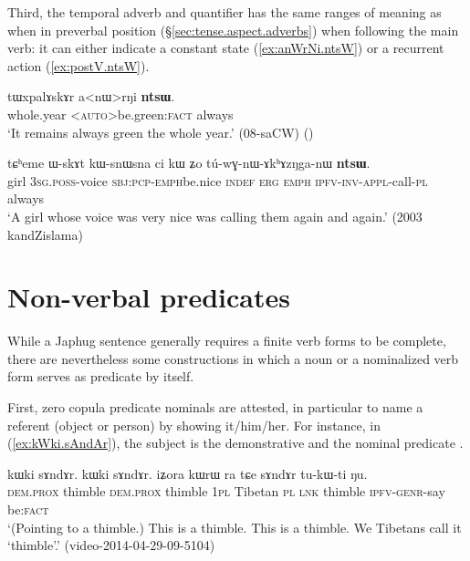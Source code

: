 Third, the temporal adverb and quantifier  has the same ranges of meaning as when in preverbal position (§\ref{sec:tense.aspect.adverbs})  when following the main verb: it can either indicate a constant state (\ref{ex:anWrNi.ntsW}) or a recurrent action (\ref{ex:postV.ntsW}).

\begin{exe}
\ex \label{ex:anWrNi.ntsW}
\gll tɯxpalɤskɤr a<nɯ>rŋi \textbf{ntsɯ}. \\
whole.year <\textsc{auto}>be.green:\textsc{fact} always \\
\glt `It remains always green the whole year.' (08-saCW)
()
\end{exe}

\begin{exe}
\ex \label{ex:postV.ntsW}
\gll  tɕʰeme ɯ-skɤt kɯ-snɯ\redp{}sna ci kɯ ʑo tú-wɣ-nɯ-ɤkʰɤzŋga-nɯ \textbf{ntsɯ}. \\
girl \textsc{3sg}.\textsc{poss}-voice \textsc{sbj}:\textsc{pcp}-\textsc{emph}\redp{}be.nice \textsc{indef} \textsc{erg} \textsc{emph} \textsc{ipfv}-\textsc{inv}-\textsc{appl}-call-\textsc{pl} always \\
\glt `A girl whose voice was very nice was calling them again and again.' (2003 kandZislama)
\end{exe}

 
\section{Non-verbal predicates} \label{sec:non.verbal.predicates}
While a Japhug sentence generally requires a finite verb forms to be complete, there are nevertheless some constructions in which a noun or a nominalized verb form serves as predicate by itself.

First, zero copula predicate nominals are attested, in particular to name a referent (object or person) by showing it/him/her. For instance, in (\ref{ex:kWki.sAndAr}), the subject is the demonstrative  and the nominal predicate . 
 
\begin{exe}
\ex \label{ex:kWki.sAndAr}
\gll kɯki sɤndɤr. kɯki sɤndɤr. iʑora kɯrɯ ra tɕe sɤndɤr tu-kɯ-ti ŋu. \\
\textsc{dem}.\textsc{prox} thimble  \textsc{dem}.\textsc{prox} thimble \textsc{1pl} Tibetan \textsc{pl} \textsc{lnk} thimble \textsc{ipfv}-\textsc{genr}-say be:\textsc{fact} \\
\glt `(Pointing to a thimble.) This is a thimble. This is a thimble. We Tibetans call it `thimble'.' (video-2014-04-29-09-5104)
\end{exe}

